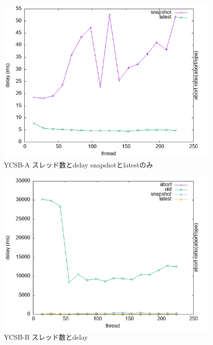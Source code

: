 \documentclass[a4paper]{jreport}	%
\begin{document}
\begin{figure}[h] 
\centering
\includegraphics[width=15cm]{data/stable/ycsb-a/delay2}
\caption{YCSB-A スレッド数とdelay snapshotとlatestのみ}
\label{fig:delay-a2}
\end{figure}


\begin{figure}[h] 
\centering
\includegraphics[width=15cm]{data/stable/ycsb-b/delay}
\caption{YCSB-B スレッド数とdelay}
\label{fig:delay-b}
\end{figure}
\end{document}
